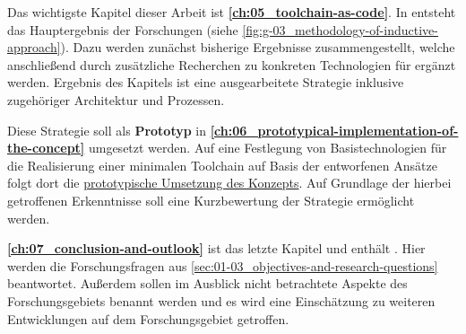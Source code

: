 Das wichtigste Kapitel dieser Arbeit ist \textbf{\autoref{ch:05_toolchain-as-code}}. In  entsteht das Hauptergebnis der Forschungen (siehe \autoref{fig:g-03_methodology-of-inductive-approach}). Dazu werden zunächst bisherige Ergebnisse zusammengestellt, welche anschließend durch zusätzliche Recherchen zu konkreten Technologien für  ergänzt werden. Ergebnis des Kapitels ist eine ausgearbeitete  Strategie inklusive zugehöriger Architektur und Prozessen.

Diese Strategie soll als \textbf{Prototyp} in \textbf{\autoref{ch:06_prototypical-implementation-of-the-concept}} umgesetzt werden. Auf eine Festlegung von Basistechnologien für die Realisierung einer minimalen Toolchain auf Basis der entworfenen Ansätze folgt dort die \hyperref[ch:06_prototypical-implementation-of-the-concept]{prototypische Umsetzung des Konzepts}. Auf Grundlage der hierbei getroffenen Erkenntnisse soll eine Kurzbewertung der  Strategie ermöglicht werden.

\textbf{\autoref{ch:07_conclusion-and-outlook}} ist das letzte Kapitel und enthält . Hier werden die Forschungsfragen aus \autoref{sec:01-03_objectives-and-research-questions} beantwortet. Außerdem sollen im Ausblick nicht betrachtete Aspekte des Forschungsgebiets benannt werden und es wird eine Einschätzung zu weiteren Entwicklungen auf dem Forschungsgebiet getroffen.
